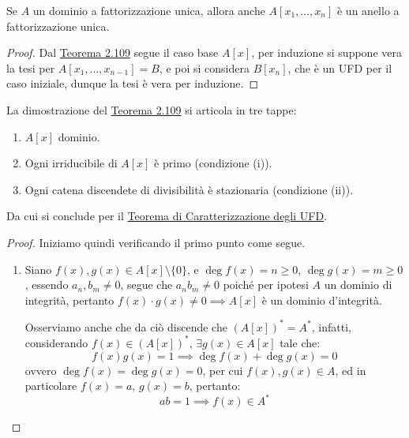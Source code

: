 \documentclass[11pt]{scrartcl}
\begin{document}
\begin{corollary}
    Se $A$ un dominio a fattorizzazione unica, allora anche $A[x_1,\ldots,x_n]$ è un anello a fattorizzazione unica.
\end{corollary}

\begin{proof}
    Dal \hyperref[2.109]{Teorema 2.109} segue il caso base $A[x]$, per induzione si suppone vera la tesi per $A[x_1,\ldots,x_{n-1}] = B$, e poi si considera $B[x_n]$, che è un UFD per il caso iniziale,
    dunque la tesi è vera per induzione.
\end{proof}

\begin{remark}
    La dimostrazione del \hyperref[2.109]{Teorema 2.109} si articola in tre tappe:
    \begin{enumerate}[(1)]
        \item $A[x]$ dominio.
        \item Ogni irriducibile di $A[x]$ è primo (condizione (i)).
        \item Ogni catena discendete di divisibilità è stazionaria (condizione (ii)).
    \end{enumerate}
    Da cui si conclude per il \hyperref[2.101]{Teorema di Caratterizzazione degli UFD}.
\end{remark}

\begin{proof}
    Iniziamo quindi verificando il primo punto come segue.
    \begin{enumerate}[(1)]
        \item Siano $f(x),g(x) \in A[x] \setminus\{0\}$, e $\deg f(x) = n \geq 0$, $\deg g(x) = m \geq 0$, essendo $a_n, b_m \ne 0$, segue che
        $a_nb_m \ne 0$ poiché per ipotesi $A$ un dominio di integrità, pertanto $f(x) \cdot g(x) \ne 0 \implies A[x]$ è un dominio d'integrità.
        \begin{remark}
            Osserviamo anche che da ciò discende che $(A[x])^* = A^*$, infatti, considerando $f(x) \in (A[x])^*$, $\exists g(x) \in A[x]$ tale che:
            \[ f(x)g(x) = 1 \implies \deg f(x) + \deg g(x) = 0
                \]
            ovvero $\deg f(x) = \deg g(x) = 0$, per cui $f(x),g(x) \in A$, ed in particolare $f(x) = a$, $g(x) = b$, pertanto:
            \[ ab = 1 \implies f(x) \in A^*
                \]
        \end{remark}
    \end{enumerate}
\end{proof}
\end{document}
